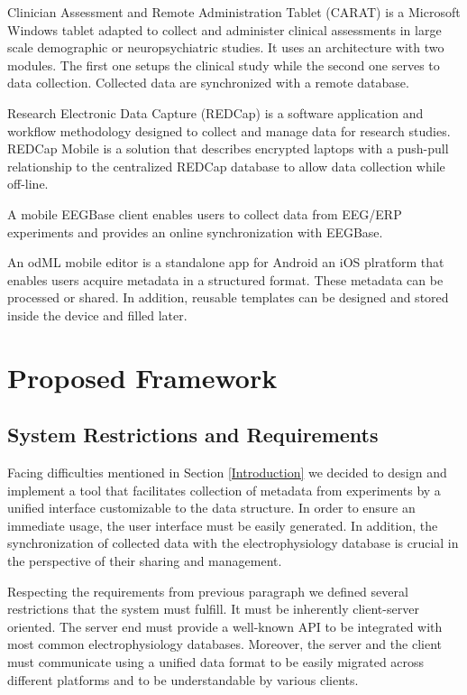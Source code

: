\documentclass[conference]{IEEEtran}
\begin{document}
Clinician Assessment and Remote Administration Tablet (CARAT) \cite{10.3389/fninf.2011.00031} is a Microsoft Windows tablet adapted to collect and administer clinical assessments in large scale demographic or neuropsychiatric studies. It uses an architecture with two modules. The first one setups the clinical study while the second one serves to data collection. Collected data are synchronized with a remote database.

Research Electronic Data Capture \cite{journals/bmcbi/Harris12} (REDCap) is a software application and workflow methodology designed to collect and manage data for research studies. REDCap Mobile \cite{Borlawsky01122011} is a solution that describes encrypted laptops with a push-pull relationship to the centralized REDCap database to allow data collection while off-line.

A mobile EEGBase client \cite{10.3389/conf.fninf.2013.09.00046} enables users to collect data from EEG/ERP experiments and provides an online synchronization with EEGBase.

An odML mobile editor \cite{10.3389/conf.fninf.2014.18.00053} is a standalone app for Android an iOS plratform that enables users acquire metadata in a structured format. These metadata can be processed or shared. In addition, reusable templates can be designed and stored inside the device and filled later.

\section{Proposed Framework}\label{Framework}

\subsection{System Restrictions and Requirements}

Facing difficulties mentioned in Section \ref{Introduction} we decided to design and implement a tool that facilitates collection of metadata from experiments by a unified interface customizable to the data structure. In order to ensure an immediate usage, the user interface must be easily generated. In addition, the synchronization of collected data with the electrophysiology database is crucial in the perspective of their sharing and management.

Respecting the requirements from previous paragraph we defined several restrictions that the system must fulfill. It must be inherently client-server oriented. The server end must provide a well-known API to be integrated with most common electrophysiology databases. Moreover, the server and the client must communicate using a unified data format to be easily migrated across different platforms and to be understandable by various clients.
\end{document}
